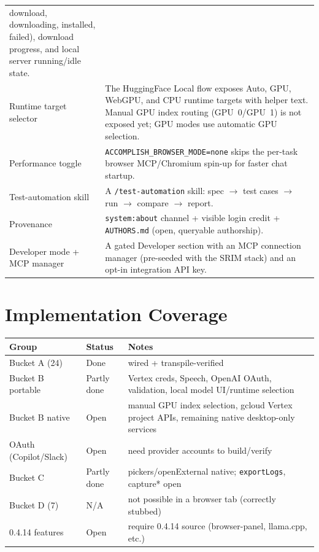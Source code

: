 \documentclass[11pt,a4paper]{article}
\begin{document}
\begin{longtable}{p{} p{}}
download, downloading, installed, failed), download progress, and local server
running/idle state. \\
Runtime target selector & The HuggingFace Local flow exposes Auto, GPU, WebGPU,
and CPU runtime targets with helper text. Manual GPU index routing
(GPU~0/GPU~1) is not exposed yet; GPU modes use automatic GPU selection. \\
Performance toggle & \verb|ACCOMPLISH_BROWSER_MODE=none| skips the per-task
browser MCP/Chromium spin-up for faster chat startup. \\
Test-automation skill & A \verb|/test-automation| skill: spec $\rightarrow$ test
cases $\rightarrow$ run $\rightarrow$ compare $\rightarrow$ report. \\
Provenance & \verb|system:about| channel + visible login credit + \verb|AUTHORS.md|
(open, queryable authorship). \\
Developer mode + MCP manager & A gated Developer section with an MCP connection
manager (pre-seeded with the SRIM stack) and an opt-in integration API key. \\
\bottomrule
\end{longtable}

\section{Implementation Coverage}
\begin{longtable}{p{} p{} p{}}
\toprule
\textbf{Group} & \textbf{Status} & \textbf{Notes} \\
\midrule
\endhead
Bucket A (24) & Done & wired + transpile-verified \\
Bucket B portable & Partly done & Vertex creds, Speech, OpenAI OAuth, validation,
local model UI/runtime selection \\
Bucket B native & Open & manual GPU index selection, gcloud Vertex project APIs,
remaining native desktop-only services \\
OAuth (Copilot/Slack) & Open & need provider accounts to build/verify \\
Bucket C & Partly done & pickers/openExternal native; \verb|exportLogs|,
capture* open \\
Bucket D (7) & N/A & not possible in a browser tab (correctly stubbed) \\
0.4.14 features & Open & require 0.4.14 source (browser-panel, llama.cpp, etc.) \\
\bottomrule
\end{longtable}
\end{document}
